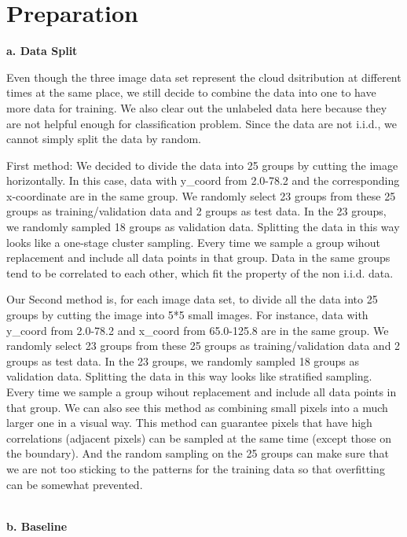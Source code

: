 \documentclass[11pt]{article}
\begin{document}
\section{Preparation}

\vspace{0.2cm}
\textbf{a. Data Split}

Even though the three image data set represent the cloud dsitribution at different times at the same place, we still decide to combine the data into one to have more data for training. We also clear out the unlabeled data here because they are not helpful enough for classification problem. Since the data are not i.i.d., we cannot simply split the data by random. 

First method:
We decided to divide the data into 25 groups by cutting the image horizontally. In this case, data with y\_coord from 2.0-78.2 and the corresponding x-coordinate are in the same group.  We randomly select 23 groups from these 25 groups as training/validation data and 2 groups as test data. In the 23 groups, we randomly sampled 18 groups as validation data. Splitting the data in this way looks like a one-stage cluster sampling. Every time we sample a group wihout replacement and include all data points in that group. Data in the same groups tend to be correlated to each other, which fit the property of the non i.i.d. data.

Our Second method is, for each image data set, to divide all the data into 25 groups by cutting the image into 5*5 small images. For instance, data with y\_coord from 2.0-78.2 and x\_coord from 65.0-125.8 are in the same group. We randomly select 23 groups from these 25 groups as training/validation data and 2 groups as test data. In the 23 groups, we randomly sampled 18 groups as validation data. Splitting the data in this way looks like stratified sampling. Every time we sample a group wihout replacement and include all data points in that group. We can also see this method as combining small pixels into a much larger one in a visual way. This method can guarantee pixels that have high correlations (adjacent pixels) can be sampled at the same time (except those on the boundary). And the random sampling on the 25 groups can make sure that we are not too sticking to the patterns for the training data so that overfitting can be somewhat prevented. 

\vspace{0.3cm}
\mbox{}\\
\textbf{b. Baseline}
\end{document}
